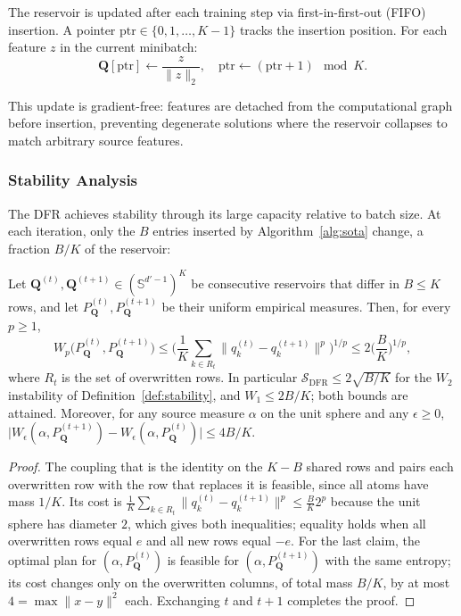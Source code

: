 The reservoir is updated after each training step via first-in-first-out (FIFO) insertion. A pointer $\text{ptr} \in \{0, 1, \dots, K-1\}$ tracks the insertion position. For each feature $z$ in the current minibatch:
\begin{equation}
    \mathbf{Q}[\text{ptr}] \leftarrow \frac{z}{\|z\|_2}, \quad \text{ptr} \leftarrow (\text{ptr} + 1) \mod K.
\end{equation}

This update is gradient-free: features are detached from the computational graph before insertion, preventing degenerate solutions where the reservoir collapses to match arbitrary source features.

\subsubsection{Stability Analysis}

The DFR achieves stability through its large capacity relative to batch size. At each iteration, only the $B$ entries inserted by Algorithm~\ref{alg:sota} change, a fraction $B/K$ of the reservoir:

\begin{proposition}
\label{prop:dfr_stability}
Let $\mathbf Q^{(t)},\mathbf Q^{(t+1)}\in(\mathbb S^{d'-1})^K$ be consecutive reservoirs that differ in $B\le K$ rows, and let $P_{\mathbf Q}^{(t)},P_{\mathbf Q}^{(t+1)}$ be their uniform empirical measures. Then, for every $p\ge1$,
\begin{equation}
    W_p\big(P_{\mathbf Q}^{(t)},P_{\mathbf Q}^{(t+1)}\big)\le\Big(\frac1K\sum_{k\in R_t}\big\|q^{(t)}_k-q^{(t+1)}_k\big\|^p\Big)^{1/p}\le2\Big(\frac BK\Big)^{1/p},
\end{equation}
where $R_t$ is the set of overwritten rows. In particular $\mathcal S_{\text{DFR}}\le2\sqrt{B/K}$ for the $W_2$ instability of Definition~\ref{def:stability}, and $W_1\le2B/K$; both bounds are attained. Moreover, for any source measure $\alpha$ on the unit sphere and any $\epsilon\ge0$, $\big|W_\epsilon(\alpha,P_{\mathbf Q}^{(t+1)})-W_\epsilon(\alpha,P_{\mathbf Q}^{(t)})\big|\le4B/K$.
\end{proposition}
\begin{proof}
The coupling that is the identity on the $K-B$ shared rows and pairs each overwritten row with the row that replaces it is feasible, since all atoms have mass $1/K$. Its cost is $\frac1K\sum_{k\in R_t}\|q^{(t)}_k-q^{(t+1)}_k\|^p\le\frac BK2^p$ because the unit sphere has diameter $2$, which gives both inequalities; equality holds when all overwritten rows equal $e$ and all new rows equal $-e$. For the last claim, the optimal plan for $(\alpha,P_{\mathbf Q}^{(t)})$ is feasible for $(\alpha,P_{\mathbf Q}^{(t+1)})$ with the same entropy; its cost changes only on the overwritten columns, of total mass $B/K$, by at most $4=\max\|x-y\|^2$ each. Exchanging $t$ and $t+1$ completes the proof.
\end{proof}

